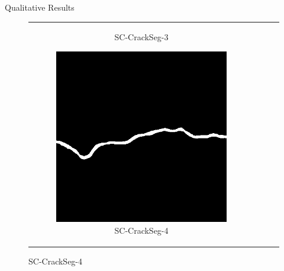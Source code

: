 \documentclass{lib/curtin_format}
\begin{document}
\begin{frame}{Qualitative Results}
\begin{figure}[htbp]
\begin{tabular}{cccc}
\begin{subfigure}[b]{0.23\textwidth}
                \caption{SC-CrackSeg-3}
                \label{fig:crackseg-experiment-qualitative-sc-crackseg-3}
            \end{subfigure}
            \begin{subfigure}[b]{0.23\textwidth}
                \centering
                \includegraphics[width=\textwidth]{res/crackseg-experiment-qualitative/sc-crackseg-4.png}
                \caption{SC-CrackSeg-4}
                \label{fig:crackseg-experiment-qualitative-sc-crackseg-4}
            \end{subfigure}
        \end{tabular}
    \end{figure}
\end{frame}
\end{document}
